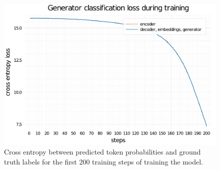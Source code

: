 \begin{figure}
    \centering
    \includegraphics[width=0.7\linewidth]{training-loss-transformer-abs-tiny.pdf}
    \caption{Cross entropy between predicted token probabilities and ground truth labels for the first 200 training steps of training the \TransformerAbsTiny model.}
    \label{training-loss-transformer-abs}
\end{figure}
